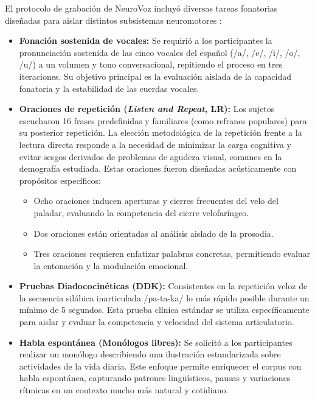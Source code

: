         El protocolo de grabación de NeuroVoz incluyó diversas tareas fonatorias diseñadas para aislar distintos subsistemas neuromotores \cite{mendes2024}:

        \begin{itemize}
            \item \textbf{Fonación sostenida de vocales:} Se requirió a los participantes la pronunciación sostenida de las cinco vocales del español (/a/, /e/, /i/, /o/, /u/) a un volumen y tono conversacional, repitiendo el proceso en tres iteraciones. Su objetivo principal es la evaluación aislada de la capacidad fonatoria y la estabilidad de las cuerdas vocales.
            
            \item \textbf{Oraciones de repetición (\textit{Listen and Repeat}, LR):} Los sujetos escucharon 16 frases predefinidas y familiares (como refranes populares) para su posterior repetición. La elección metodológica de la repetición frente a la lectura directa responde a la necesidad de minimizar la carga cognitiva y evitar sesgos derivados de problemas de agudeza visual, comunes en la demografía estudiada. Estas oraciones fueron diseñadas acústicamente con propósitos específicos:
            \begin{itemize}
                \item Ocho oraciones inducen aperturas y cierres frecuentes del velo del paladar, evaluando la competencia del cierre velofaríngeo.
                \item Dos oraciones están orientadas al análisis aislado de la prosodia.
                \item Tres oraciones requieren enfatizar palabras concretas, permitiendo evaluar la entonación y la modulación emocional.
            \end{itemize}
            
            \item \textbf{Pruebas Diadococinéticas (DDK):} Consistentes en la repetición veloz de la secuencia silábica inarticulada /pa-ta-ka/ lo más rápido posible durante un mínimo de 5 segundos. Esta prueba clínica estándar se utiliza específicamente para aislar y evaluar la competencia y velocidad del sistema articulatorio.
            
            \item \textbf{Habla espontánea (Monólogos libres):} Se solicitó a los participantes realizar un monólogo describiendo una ilustración estandarizada sobre actividades de la vida diaria. Este enfoque permite enriquecer el corpus con habla espontánea, capturando patrones lingüísticos, pausas y variaciones rítmicas en un contexto mucho más natural y cotidiano.
        \end{itemize}

